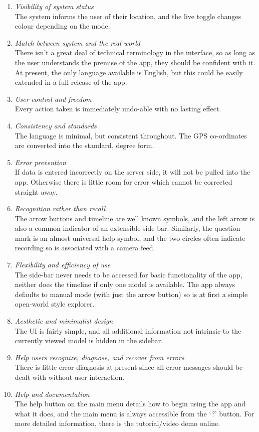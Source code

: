 \documentclass[12pt, a4paper]{article}
\begin{document}
\begin{enumerate}
    \item \textit{Visibility of system status} \\
    The system informs the user of their location, and the live toggle changes colour depending on the mode.
    
    \item \textit{Match between system and the real world} \\
    There isn't a great deal of technical terminology in the interface, so as long as the user understands the premise of the app, they should be confident with it. At present, the only language available is English, but this could be easily extended in a full release of the app. 
    \item \textit{User control and freedom} \\
    Every action taken is immediately undo-able with no lasting effect.
    \item \textit{Consistency and standards} \\
    The language is minimal, but consistent throughout. The GPS co-ordinates are converted into the standard, degree form.
    \item \textit{Error prevention} \\
    If data is entered incorrectly on the server side, it will not be pulled into the app. Otherwise there is little room for error which cannot be corrected straight away.
    \item \textit{Recognition rather than recall} \\
    The arrow buttons and timeline are well known symbols, and the left arrow is also a common indicator of an extensible side bar. Similarly, the question mark is an almost universal help symbol, and the two circles often indicate recording so is associated with a camera feed.
    \item \textit{Flexibility and efficiency of use} \\
    The side-bar never needs to be accessed for basic functionality of the app, neither does the timeline if only one model is available. The app always defaults to manual mode (with just the arrow button) so is at first a simple open-world style explorer.
    \item \textit{Aesthetic and minimalist design} \\
    The UI is fairly simple, and all additional information not intrinsic to the currently viewed model is hidden in the sidebar.
    \item \textit{Help users recognize, diagnose, and recover from errors} \\
    There is little error diagnosis at present since all error messages should be dealt with without user interaction.
    \item \textit{Help and documentation} \\
    The help button on the main menu details how to begin using the app and what it does, and the main menu is always accessible from the `?' button. For more detailed information, there is the tutorial/video demo online. \cite{design:videodemo}
\end{enumerate}
\end{document}
